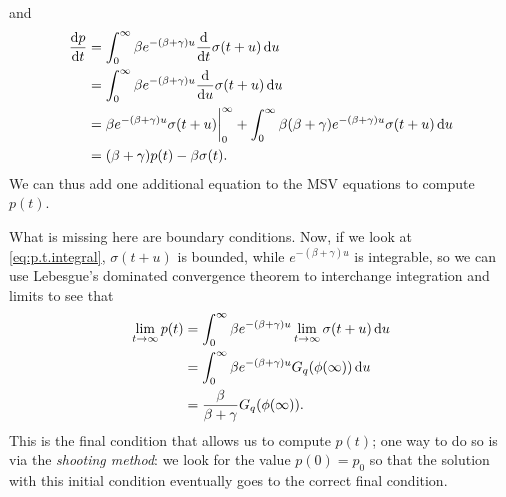 \documentclass[11pt]{article}
\newcommand{\dee}{{\rm d}}
\newcommand{\dd}[2]{\frac{\dee #1}{\dee #2}}
\newcommand{\ddt}[1]{\dd{#1}{t}}
\begin{document}
and
\begin{subequations}
\begin{align}
	\ddt{p} &= \int_{0}^{\infty} \beta e^{-(\beta+\gamma)u} \ddt{}\sigma(t+u)\, \dee u\\
	&= \int_{0}^{\infty} \beta e^{-(\beta+\gamma)u} \dd{}{u}\sigma(t+u)\, \dee u\\
	&=  \beta e^{-(\beta+\gamma)u} \sigma(t+u)\bigg|_{0}^{\infty} + \int_{0}^{\infty} \beta (\beta+\gamma) e^{-(\beta+\gamma)u}\sigma(t+u)\, \dee u\\
	&= (\beta+\gamma)p(t) -\beta \sigma (t).
\end{align}
\end{subequations}
We can thus add one additional equation to the MSV equations to compute $p(t)$.

What is missing here are boundary conditions.  Now, if we look at \eqref{eq:p.t.integral}, $\sigma(t+u)$ is bounded, while $e^{-(\beta+\gamma)u}$ is integrable, so we can use Lebesgue's dominated convergence theorem to interchange integration and limits to see that
\begin{subequations}
\begin{align}
	\lim_{t \to \infty} p(t) &= \int_{0}^{\infty} \beta e^{-(\beta+\gamma)u} \lim_{t \to \infty} \sigma(t+u)\, \dee u\\
	&= \int_{0}^{\infty} \beta e^{-(\beta+\gamma)u} G_{q}(\phi(\infty))\, \dee u\\
	&= \frac{\beta}{\beta+\gamma} G_{q}(\phi(\infty)).
\end{align}
\end{subequations}
This is the final condition that allows us to compute $p(t)$; one way to do so is via the \emph{shooting method}: we look for the value $p(0) = p_{0}$ so that the solution with this initial condition eventually goes to the correct final condition.  
\end{document}

